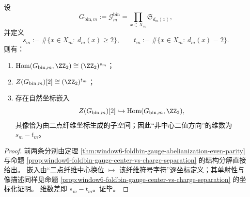 \begin{proposition}\label{prop:conclusion-foldbin-gauge-center-charge-gap}
设
\[
G_{\mathrm{bin},m}:=\mathcal{G}^{\mathrm{bin}}_m
=\prod_{x\in X_m}\mathfrak S_{d_m(x)},
\]
并定义
\[
s_m:=\#\{x\in X_m:\ d_m(x)\ge 2\},\qquad
t_m:=\#\{x\in X_m:\ d_m(x)=2\}.
\]
则有：
\begin{enumerate}
  \item \(\mathrm{Hom}(G_{\mathrm{bin},m},\ZZ_2)\cong (\ZZ_2)^{s_m}\)；
  \item \(Z(G_{\mathrm{bin},m})[2]\cong (\ZZ_2)^{t_m}\)；
  \item 存在自然坐标嵌入
  \[
  Z(G_{\mathrm{bin},m})[2]\hookrightarrow \mathrm{Hom}(G_{\mathrm{bin},m},\ZZ_2),
  \]
  其像恰为由二点纤维坐标生成的子空间；因此“非中心二值方向”的维数为 \(s_m-t_m\)。
\end{enumerate}
\end{proposition}
\begin{proof}
前两条分别由定理 \ref{thm:window6-foldbin-gauge-abelianization-even-parity} 与命题 \ref{prop:window6-foldbin-gauge-center-vs-charge-separation} 的结构分解直接给出。
嵌入由“二点纤维中心换位 \(\mapsto\) 该纤维符号字符”逐坐标定义；其单射性与像描述同样见命题 \ref{prop:window6-foldbin-gauge-center-vs-charge-separation} 的坐标化证明。
维数差即 \(s_m-t_m\)。证毕。
\end{proof}

